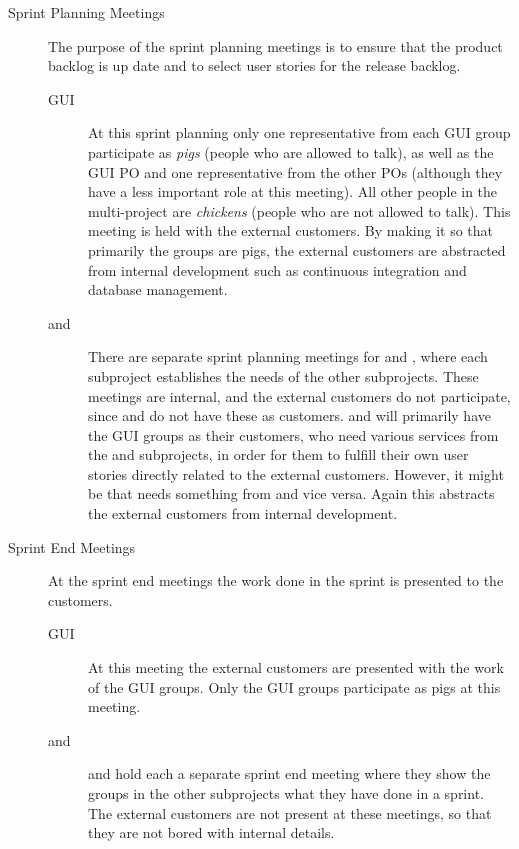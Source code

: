 \begin{description}
  \item[Sprint Planning Meetings]
  The purpose of the sprint planning meetings is to ensure that the product backlog is up date and to select user stories for the release backlog.
  \begin{description}
    \item[GUI] At this sprint planning only one representative from each GUI group participate as \emph{pigs} (people who are allowed to talk), as well as the GUI PO and one representative from the other POs (although they have a less important role at this meeting). All other people in the multi-project are \emph{chickens} (people who are not allowed to talk). This meeting is held with the external customers. By making it so that primarily the \gui groups are pigs, the external customers are abstracted from internal development such as continuous integration and database management.
    \item[\db and \bd] There are separate sprint planning meetings for \db and \bd, where each subproject establishes the needs of the other subprojects. These meetings are internal, and the external customers do not participate, since \db and \bd do not have these as customers. \db and \bd will primarily have the GUI groups as their customers, who need various services from the \db and \bd subprojects, in order for them to fulfill their own user stories directly related to the external customers. However, it might be that \db needs something from \bd and vice versa. Again this abstracts the external customers from internal development.
  \end{description}
  \item[Sprint End Meetings]
  At the sprint end meetings the work done in the sprint is presented to the customers.
  \begin{description}
    \item[GUI] At this meeting the external customers are presented with the work of the GUI groups. Only the GUI groups participate as pigs at this meeting.
    \item[\db and \bd] \db and \bd hold each a separate sprint end meeting where they show the groups in the other subprojects what they have done in a sprint. The external customers are not present at these meetings, so that they are not bored with internal details.
  \end{description}
\end{description}

